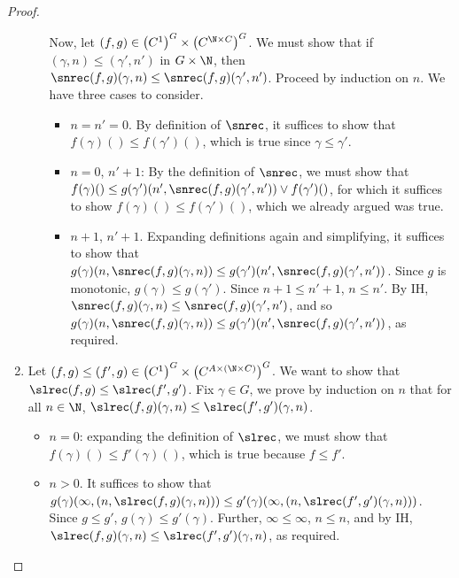 \begin{proof}
\begin{enumerate}
\begin{itemize}
    Now, let $(f,g) \in {\left(C^1\right)}^G\times {\left(C^{\N\times C}\right)}^G$. We must show that if $(\gamma,n) \leq (\gamma',n')$ in $G \times \N$, then $\snrec(f,g)(\gamma,n) \leq \snrec(f,g)(\gamma',n')$. Proceed by induction on $n$. We have three cases to consider.
    \begin{itemize}
      \item $n = n' = 0$. By definition of $\snrec$, it suffices to show that $f(\gamma)() \leq f(\gamma')()$, which is true since $\gamma \leq \gamma'$.
      \item $n = 0$, $n' + 1$: By the definition of $\snrec$, we must show that $f(\gamma)() \leq g(\gamma')(n',\snrec(f,g)(\gamma',n')) \vee f(\gamma')()$, for which it suffices to show $f(\gamma)() \leq f(\gamma')()$, which we already argued was true.
      \item $n+1$, $n'+1$. Expanding definitions again and simplifying, it suffices to show that $g(\gamma)(n,\snrec(f,g)(\gamma,n)) \leq g(\gamma')(n',\snrec(f,g)(\gamma',n'))$. Since $g$ is monotonic, $g(\gamma) \leq g(\gamma')$. Since $n + 1 \leq n' + 1$, $n \leq n'$. By IH, $\snrec(f,g)(\gamma,n) \leq \snrec(f,g)(\gamma',n')$, and so $g(\gamma)(n,\snrec(f,g)(\gamma,n)) \leq g(\gamma')(n',\snrec(f,g)(\gamma',n'))$, as required.
    \end{itemize}
  \end{itemize}
  \item Let $(f,g) \leq (f',g) \in {\left(C^1\right)^G} \times {\left(C^{A \times (\N \times C)}\right)^G}$. We want to show that $\slrec(f,g) \leq \slrec(f',g')$. Fix $\gamma \in G$, we prove by induction on $n$ that for all $n \in \N$, $\slrec(f,g)(\gamma,n) \leq \slrec(f',g')(\gamma,n)$.
    \begin{itemize}
      \item $n = 0$: expanding the definition of $\slrec$, we must show that $f(\gamma)() \leq f'(\gamma)()$, which is true because $f \leq f'$.
      \item $n > 0$. It suffices to show that $g(\gamma)(\infty,(n,\slrec(f,g)(\gamma,n))) \leq g'(\gamma)(\infty,(n,\slrec(f',g')(\gamma,n)))$. Since $g \leq g'$, $g(\gamma) \leq g'(\gamma)$. Further, $\infty \leq \infty$, $n \leq n$, and by IH, $\slrec(f,g)(\gamma,n) \leq \slrec(f',g')(\gamma,n)$, as required.
    \end{itemize}
    

\end{enumerate}
\end{proof}
